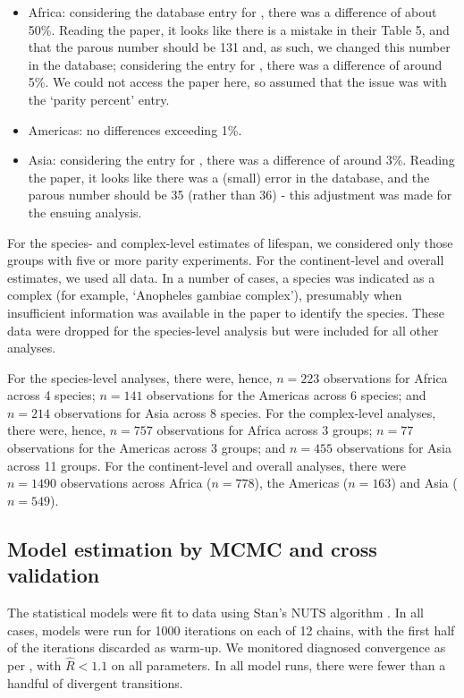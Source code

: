 \documentclass[12pt]{article}
\begin{document}
{\begin{itemize}
	\item Africa: considering the database entry for \cite{ijumba2002malaria}, there was a difference of about 50\%. Reading the paper, it looks like there is a mistake in their Table 5, and that the parous number should be 131 and, as such, we changed this number in the database; considering the entry for \cite{bockarie46service}, there was a difference of around 5\%. We could not access the paper here, so assumed that the issue was with the `parity percent' entry.
	\item Americas: no differences exceeding 1\%.
	\item Asia: considering the entry for \cite{kitthawee1992relationship}, there was a difference of around 3\%. Reading the paper, it looks like there was a (small) error in the database, and the parous number should be 35 (rather than 36) - this adjustment was made for the ensuing analysis.
\end{itemize}

For the species- and complex-level estimates of lifespan, we considered only those groups with five or more parity experiments. For the continent-level and overall estimates, we used all data. In a number of cases, a species was indicated as a complex (for example, `Anopheles gambiae complex'), presumably when insufficient information was available in the paper to identify the species. These data were dropped for the species-level analysis but were included for all other analyses.

For the species-level analyses, there were, hence, $n=223$ observations for Africa across 4 species; $n=141$ observations for the Americas across 6 species; and $n=214$ observations for Asia across 8 species. For the complex-level analyses, there were, hence, $n=757$ observations for Africa across 3 groups; $n=77$ observations for the Americas across 3 groups; and $n=455$ observations for Asia across 11 groups. For the continent-level and overall analyses, there were $n=1490$ observations across Africa ($n=778$), the Americas ($n=163$) and Asia ($n=549$).




\subsection{Model estimation by MCMC and cross validation}
The statistical models were fit to data using Stan's NUTS algorithm \cite{carpenter2016stan}. In all cases, models were run for 1000 iterations on each of 12 chains, with the first half of the iterations discarded as warm-up. We monitored diagnosed convergence as per \cite{gelman1992inference}, with $\hat{R}<1.1$ on all parameters. In all model runs, there were fewer than a handful of divergent transitions. 

}
\end{document}
